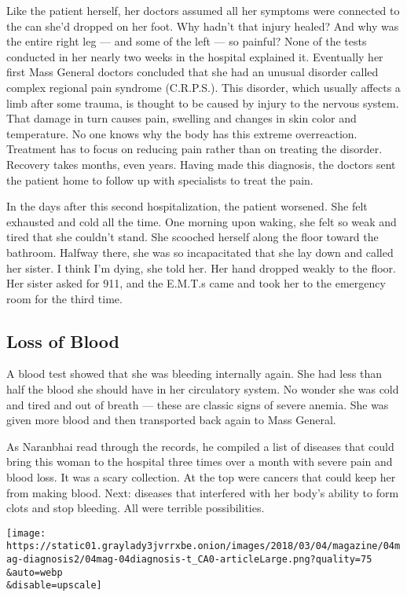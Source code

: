 Like the patient herself, her doctors assumed all her symptoms were
connected to the can she'd dropped on her foot. Why hadn't that injury
healed? And why was the entire right leg --- and some of the left --- so
painful? None of the tests conducted in her nearly two weeks in the
hospital explained it. Eventually her first Mass General doctors
concluded that she had an unusual disorder called complex regional pain
syndrome (C.R.P.S.). This disorder, which usually affects a limb after
some trauma, is thought to be caused by injury to the nervous system.
That damage in turn causes pain, swelling and changes in skin color and
temperature. No one knows why the body has this extreme overreaction.
Treatment has to focus on reducing pain rather than on treating the
disorder. Recovery takes months, even years. Having made this diagnosis,
the doctors sent the patient home to follow up with specialists to treat
the pain.

In the days after this second hospitalization, the patient worsened. She
felt exhausted and cold all the time. One morning upon waking, she felt
so weak and tired that she couldn't stand. She scooched herself along
the floor toward the bathroom. Halfway there, she was so incapacitated
that she lay down and called her sister. I think I'm dying, she told
her. Her hand dropped weakly to the floor. Her sister asked for 911, and
the E.M.T.s came and took her to the emergency room for the third time.

\hypertarget{loss-of-blood}{%
\subsection{\texorpdfstring{\textbf{Loss of
Blood}}{Loss of Blood}}\label{loss-of-blood}}

A blood test showed that she was bleeding internally again. She had less
than half the blood she should have in her circulatory system. No wonder
she was cold and tired and out of breath --- these are classic signs of
severe anemia. She was given more blood and then transported back again
to Mass General.

As Naranbhai read through the records, he compiled a list of diseases
that could bring this woman to the hospital three times over a month
with severe pain and blood loss. It was a scary collection. At the top
were cancers that could keep her from making blood. Next: diseases that
interfered with her body's ability to form clots and stop bleeding. All
were terrible possibilities.

\texttt{[image: https://static01.graylady3jvrrxbe.onion/images/2018/03/04/magazine/04mag-diagnosis2/04mag-04diagnosis-t\_CA0-articleLarge.png?quality=75\\\&auto=webp\\\&disable=upscale]}


